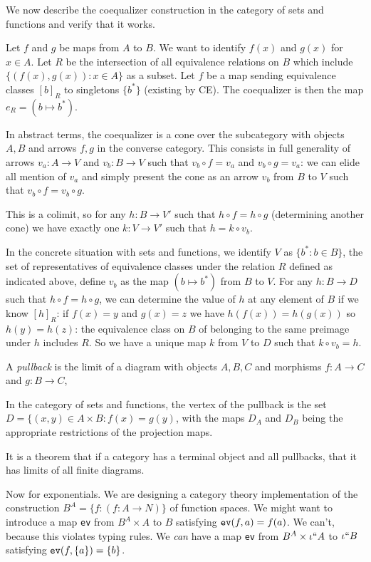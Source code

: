 \documentclass[12pt]{article}
\begin{document}
We now describe the coequalizer construction in the category of sets and functions and verify that it works.

Let $f$ and $g$ be maps from $A$ to $B$.  We want to identify $f(x)$ and $g(x)$ for $x \in A$.  Let $R$ be the intersection of all equivalence relations on $B$
which include $\{(f(x),g(x)):x \in A\}$ as a subset.  Let $f$ be a map sending equivalence classes $[b]_R$ to singletons $\{b^*\}$ (existing by CE).  The coequalizer is then the map
$e_R = (b \mapsto b^*)$.

In abstract terms, the coequalizer is a cone over the subcategory with objects $A,B$ and arrows $f,g$ in the converse category.  This consists in full generality
of arrows $v_a:A \rightarrow V$ and $v_b:B \rightarrow V$ such that $v_b \circ f = v_a$ and $v_b \circ g = v_a$:  we can elide all mention of $v_a$ and simply present the cone
as an arrow $v_b$ from $B$ to $V$ such that $v_b \circ f = v_b \circ g$.

This is a colimit, so for any $h:B \rightarrow V'$ such that $h \circ f = h \circ g$ (determining another cone) we have exactly one $k: V \rightarrow V'$ such that $h = k \circ v_b$.

In the concrete situation with sets and functions, we identify $V$ as $\{b^*:b \in B\}$, the set of representatives of equivalence classes under the relation $R$ defined
as indicated above, define $v_b$ as the map $(b \mapsto b^*)$ from $B$ to $V$.  For any $h:B \rightarrow D$ such that $h \circ f = h \circ g$, we can determine the value
of $h$ at any element of $B$ if we know $[h]_R$:  if $f(x)=y$ and $g(x)=z$ we have $h(f(x)) = h(g(x))$ so $h(y)=h(z)$:  the equivalence class on $B$ of belonging to the same
preimage under $h$ includes $R$.  So we have a unique map $k$ from  $V$ to $D$ such that $k \circ v_b = h$.

A {\em pullback\/} is the limit of a diagram with objects $A,B,C$ and morphisms $f:A\rightarrow C$ and $g:B \rightarrow C$,

In the category of sets and functions, the vertex of the pullback is the set $D = \{(x,y) \in A \times B:f(x)=g(y)$, with the maps $D_A$ and $D_B$ being the appropriate restrictions of the projection maps.

It is a theorem that if a category has a terminal object and all pullbacks, that it has limits of all finite diagrams.

Now for exponentials.  We are designing a category theory implementation of the construction $B^A = \{f:(f:A \rightarrow N)\}$ of function spaces.  We might want to introduce
a map {\tt ev} from $B^A \times A$ to $B$ satisfying ${\tt ev}(f,a) = f(a)$.  We can't, because this violates typing rules.  We {\em can\/} have a map {\tt ev} from
$B^A \times \iota``A$ to $\iota``B$ satisfying ${\tt ev}(f,\{a\}) = \{b\}$.
\end{document}
